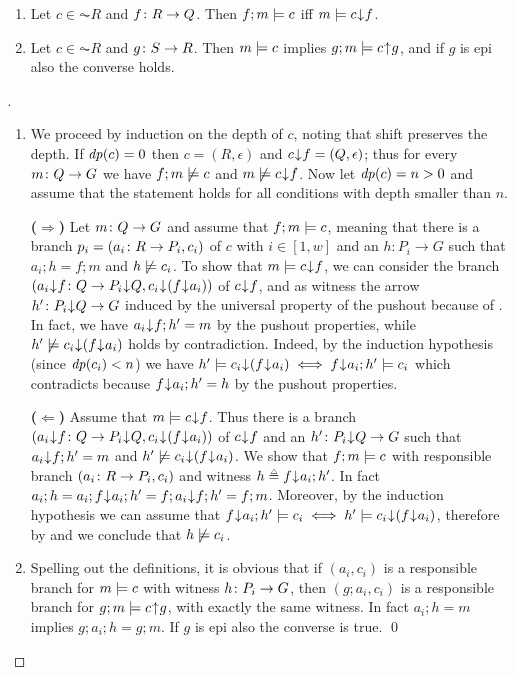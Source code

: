 \begin{proposition}\label{prop:shiftSat}
\begin{enumerate}[defsep]
\item
  Let $c \in \AC R$ and $f\colon R \rightarrow Q$. Then $f;m \models c$ iff $m \models {c}{\mskip1mu\downarrow\mskip1mu}{f}$.
\item   
  Let $c \in \AC R$ and $g\colon S \rightarrow R$. Then  $m \models c$ implies $g;m \models {c}{\mskip1mu\uparrow\mskip1mu}{g}$, and if $g$ is epi also the converse holds.
\end{enumerate}
\end{proposition}

\begin{proof}[]~
\begin{enumerate}
\item We proceed by induction on the depth of $c$, noting that shift preserves the depth. If $\mathit{dp}(c) = 0$ then $c = (R, \epsilon)$ and ${c}{\mskip1mu\downarrow\mskip1mu}{f} = (Q,\epsilon)$; thus for every $m \colon Q \rightarrow G$ we have $f;m \not \models c$ and $m \not \models {c}{\mskip1mu\downarrow\mskip1mu}{f}$. Now let $\mathit{dp}(c) = n > 0$ and assume that the statement holds for all conditions with depth smaller than $n$.

 \textbf{($\Rightarrow$)} Let $m\colon Q \rightarrow G$ and assume that $f;m \models c$, meaning that there is a branch $p_i = (a_i\colon R \rightarrow P_i, c_i)$ of $c$ with $i \in [1,w]$ and an $h: P_i \to G$ such that \tagone $a_i ; h = f;m$ and \tagtwo $h \not \models c_i$. To show that $m \models {c}{\mskip1mu\downarrow\mskip1mu}{f}$, we can consider the branch $(a_i{\mskip1mu\downarrow\mskip1mu} f\colon Q \rightarrow  P_i {\mskip1mu\downarrow\mskip1mu} Q, {c_i}{\mskip1mu\downarrow\mskip1mu}{(f{\mskip1mu\downarrow\mskip1mu} a_i)})$ of ${c}{\mskip1mu\downarrow\mskip1mu}{f}$, and as witness the arrow $h'\colon P_i {\mskip1mu\downarrow\mskip1mu} Q \rightarrow G$ induced by the universal property of the pushout because of \tagone. In fact, we have $a_i{\mskip1mu\downarrow\mskip1mu} f;h' = m$ by the pushout properties, while $h' \not \models {c_i}{\mskip1mu\downarrow\mskip1mu}{(f{\mskip1mu\downarrow\mskip1mu}a_i)}$ holds by contradiction. Indeed, by the induction hypothesis (since $\mathit{dp}(c_i) < n$) we have $h' \models {c_i}{\mskip1mu\downarrow\mskip1mu}{(f{\mskip1mu\downarrow\mskip1mu}a_i)} \iff f{\mskip1mu\downarrow\mskip1mu} a_i ; h' \models c_i$ which contradicts \tagtwo because $f{\mskip1mu\downarrow\mskip1mu} a_i ; h' = h$ by the pushout properties.
 
 \textbf{($\Leftarrow$)} Assume that $m \models {c}{\mskip1mu\downarrow\mskip1mu}{f}$. Thus there is a branch  
$(a_i{\mskip1mu\downarrow\mskip1mu} f\colon Q \rightarrow  P_i {\mskip1mu\downarrow\mskip1mu} Q, {c_i}{\mskip1mu\downarrow\mskip1mu}{(f{\mskip1mu\downarrow\mskip1mu} a_i)})$ of ${c}{\mskip1mu\downarrow\mskip1mu}{f}$ and an $h'\colon P_i {\mskip1mu\downarrow\mskip1mu} Q \rightarrow G$ such that $a_i{\mskip1mu\downarrow\mskip1mu} f;h' = m$ and \tagthree $h' \not \models {c_i}{\mskip1mu\downarrow\mskip1mu}{(f{\mskip1mu\downarrow\mskip1mu}a_i)}$. We show that $f;m \models c$ with responsible branch $(a_i\colon R \rightarrow P_i,c_i)$ and witness \tagfour $h \isdef f\tdarr a_i ; h'$. In fact $a_i; h = a_i; f{\mskip1mu\downarrow\mskip1mu} a_i ; h' = f; a_i{\mskip1mu\downarrow\mskip1mu} f; h' = f ; m$. Moreover, by the induction hypothesis we can assume that $f {\mskip1mu\downarrow\mskip1mu} a_i; h' \models c_i \iff h' \models {c_i}{\mskip1mu\downarrow\mskip1mu}{(f {\mskip1mu\downarrow\mskip1mu}a_i)}$, therefore by \tagthree and \tagfour we conclude that $h \not \models c_i$.     

\item
Spelling out the definitions, it is obvious that if $(a_i, c_i)$ is a responsible branch for $m \models c$ with witness $h\colon P_i \rightarrow G$, then $(g;a_i,c_i)$ is a responsible branch for $g;m \models  {c}{\mskip1mu\uparrow\mskip1mu}{g}$, with exactly the same witness. In fact $a_i; h = m$ implies $g;a_i ; h = g ; m$. If $g$ is epi also the converse is true. \qed
\end{enumerate}
\end{proof}
